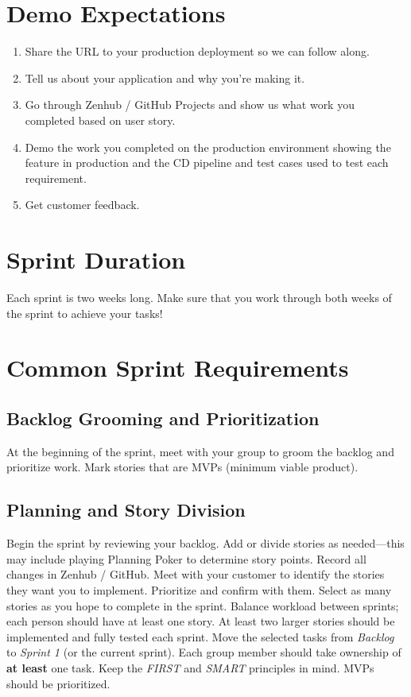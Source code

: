 \documentclass{article}
\begin{document}
\section*{Demo Expectations}

\begin{enumerate}[label=\arabic*)]
\item Share the URL to your production deployment so we can follow along.
\item Tell us about your application and why you’re making it.
\item Go through Zenhub / GitHub Projects and show us what work you completed based on user story.
\item Demo the work you completed on the production environment showing the feature in production and the CD pipeline and test cases used to test each requirement.
\item Get customer feedback.
\end{enumerate}

\section*{Sprint Duration}

Each sprint is two weeks long. Make sure that you work through both weeks of the sprint to achieve your tasks!

\section*{Common Sprint Requirements}

\subsection*{Backlog Grooming and Prioritization}
At the beginning of the sprint, meet with your group to groom the backlog and prioritize work. Mark stories that are MVPs (minimum viable product).

\subsection*{Planning and Story Division}
Begin the sprint by reviewing your backlog. Add or divide stories as needed—this may include playing Planning Poker to determine story points. Record all changes in Zenhub / GitHub. Meet with your customer to identify the stories they want you to implement. Prioritize and confirm with them. Select as many stories as you hope to complete in the sprint. Balance workload between sprints; each person should have at least one story. At least two larger stories should be implemented and fully tested each sprint. Move the selected tasks from \emph{Backlog} to \emph{Sprint 1} (or the current sprint). Each group member should take ownership of \textbf{at least} one task. Keep the \emph{FIRST} and \emph{SMART} principles in mind. MVPs should be prioritized.
\end{document}
